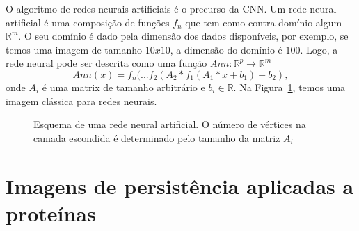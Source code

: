 O algoritmo de redes neurais artificiais é o precurso da CNN. Um rede neural
artificial é uma composição de funções $f_n$ que tem como contra domínio algum
$\mathbb{R}^m$. O seu domínio é dado pela dimensão dos dados disponíveis, por
exemplo, se temos uma imagem de tamanho $10x10$, a dimensão do domínio é $100$.
Logo, a rede neural pode ser descrita como uma função $Ann:\mathbb{R}^p \to
\mathbb{R}^m$
\begin{equation}
  Ann(x) = f_n(...f_2(A_2 * f_1(A_1*x + b_1) + b_2),
\end{equation}
onde $A_i$ é uma matrix de tamanho arbitrário e $b_i \in \mathbb{R}$.
Na Figura~\ref{fig:Ann}, temos uma imagem clássica para redes neurais.
\begin{figure}[ht]
    \centering
    \caption{Esquema de uma rede neural artificial. O número de vértices
    na camada escondida é determinado pelo tamanho da matriz $A_i$}
    \label{fig:Ann}
\end{figure}

\section{Imagens de persistência aplicadas a proteínas}
